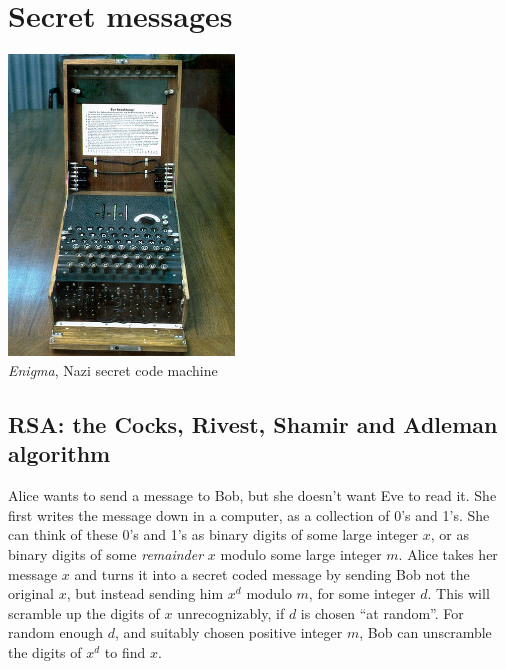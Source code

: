 \chapter{Secret messages}\label{chapter:RSA}
\begin{epigraphs}
\end{epigraphs}
\begin{center}
\begin{minipage}{6cm}
\includegraphics[width=6cm]{Enigma.jpg}
\\
\emph{Enigma}, Nazi secret code machine
\end{minipage}
\end{center}
\section{RSA:  the Cocks, Rivest, Shamir and Adleman algorithm}

\begin{example}
Alice wants to send a message to Bob, but she doesn't want Eve to read it.
She first writes the message down in a computer, as a collection of 0's and 1's.
She can think of these 0's and 1's as binary digits of some large integer \(x\), or as binary digits of some \emph{remainder} \(x\) modulo some large integer \(m\).
Alice takes her message \(x\) and turns it into a secret coded message by sending Bob not the original \(x\), but instead sending him \(x^d\) modulo \(m\), for some integer \(d\).
This will scramble up the digits of \(x\) unrecognizably, if \(d\) is chosen ``at random''.
For random enough \(d\), and suitably chosen positive integer \(m\), Bob can unscramble the digits of \(x^d\) to find \(x\).
\end{example}

